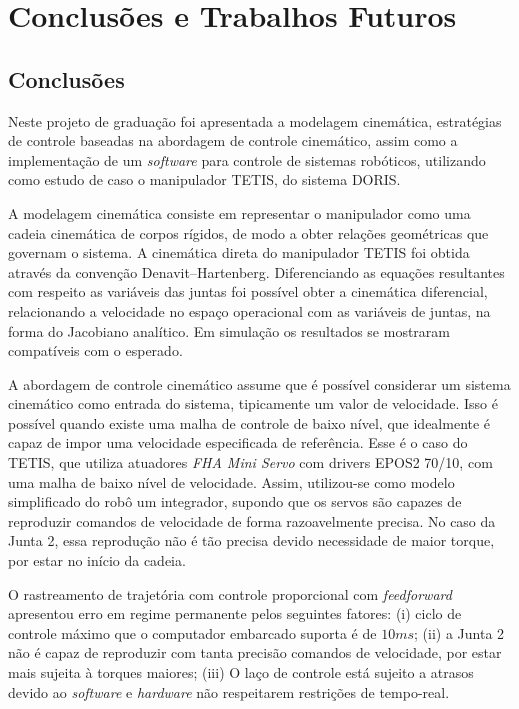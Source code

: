 \chapter{Conclusões e Trabalhos Futuros}

\section{Conclusões}

Neste projeto de graduação foi apresentada a modelagem cinemática, estratégias de controle baseadas na abordagem de controle cinemático, assim como a implementação de um \textit{software} para controle de sistemas robóticos, utilizando como estudo de caso o manipulador TETIS, do sistema DORIS. 

A modelagem cinemática consiste em representar o manipulador como uma cadeia cinemática de corpos rígidos, de modo a obter relações geométricas que governam o sistema. A cinemática direta do manipulador TETIS foi obtida através da convenção Denavit–Hartenberg. Diferenciando as equações resultantes com respeito as variáveis das juntas foi possível obter a cinemática diferencial, relacionando a velocidade no espaço operacional com as variáveis de juntas, na forma do Jacobiano analítico. Em simulação os resultados se mostraram compatíveis com o esperado. 

A abordagem de controle cinemático assume que é possível considerar um sistema cinemático como entrada do sistema, tipicamente um valor de velocidade. Isso é possível quando existe uma malha de controle de baixo nível, que idealmente é capaz de impor uma velocidade especificada de referência. Esse é o caso do TETIS, que utiliza atuadores \textit{FHA Mini Servo} com drivers EPOS2 70/10, com uma malha de baixo nível de velocidade. Assim, utilizou-se como modelo simplificado do robô um integrador, supondo que os servos são capazes de reproduzir comandos de velocidade de forma razoavelmente precisa. No caso da Junta 2, essa reprodução não é tão precisa devido necessidade de maior torque, por estar no início da cadeia.

O rastreamento de trajetória com controle proporcional com \textit{feedforward} apresentou erro em regime permanente pelos seguintes fatores: (i) ciclo de controle máximo que o computador embarcado suporta é de $10ms$; (ii) a Junta 2 não é capaz de reproduzir com tanta precisão comandos de velocidade, por estar mais sujeita à torques maiores; (iii) O laço de controle está sujeito a atrasos devido ao \textit{software} e \textit{hardware} não respeitarem restrições de tempo-real. 

